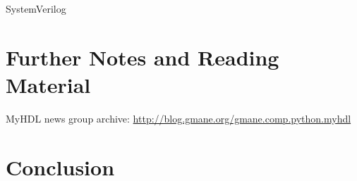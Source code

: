 \documentclass[10pt, conference, compsocconf]{IEEEtran}
\begin{document}
SystemVerilog

\section{Further Notes and Reading Material}

MyHDL news group archive: \url{http://blog.gmane.org/gmane.comp.python.myhdl}






\section{Conclusion}
\label{sec:conclusion}





\end{document}
